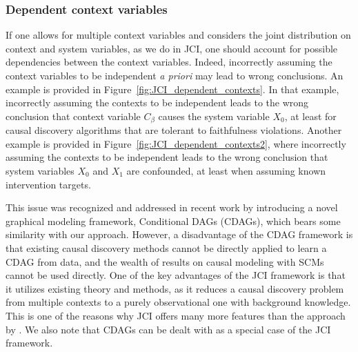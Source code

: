 \documentclass[twoside,11pt]{article}
\newcommand\eref[1]{(\ref{#1})}
\begin{document}
\subsubsection{Dependent context variables}
If one allows for multiple context variables and considers the joint distribution on context and system variables, as we do in JCI, one should account for possible dependencies between the context variables. Indeed, incorrectly assuming the context variables to be independent \emph{a priori} may lead to wrong conclusions. An example is provided in Figure~\ref{fig:JCI_dependent_contexts}. In that example, incorrectly assuming the contexts to be independent leads to the wrong conclusion that context variable $C_\beta$ causes the system variable $X_0$, at least for causal discovery algorithms that are tolerant to faithfulness violations.
Another example is provided in Figure~\ref{fig:JCI_dependent_contexts2}, where incorrectly assuming the contexts to be independent leads to the wrong conclusion that system variables $X_0$ and $X_1$ are confounded, at least when assuming known intervention targets.

This issue was recognized and addressed in recent work \citep{oates2016estimating} by introducing a novel graphical modeling framework, Conditional DAGs (CDAGs), which bears some similarity with our approach. However, a disadvantage of the CDAG framework is that existing causal discovery methods cannot be directly applied to learn a CDAG from data, and the wealth of results on causal modeling with SCMs cannot be used directly. One of the key advantages of the JCI framework is that it utilizes existing theory and methods, as it reduces a causal discovery problem from multiple contexts to a purely observational one with background knowledge. This is one of the reasons why JCI offers many more features than the approach by \citet{oates2016estimating}. We also note that CDAGs can be dealt with as a special case of the JCI framework. %

\end{document}
